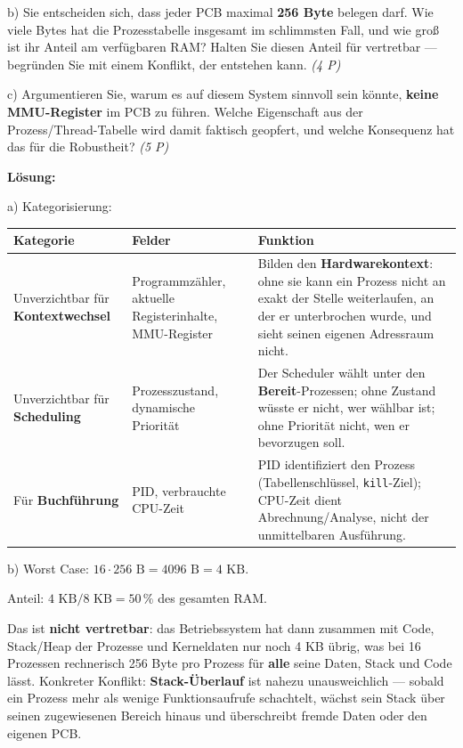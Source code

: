 \documentclass[11pt, a4paper]{article}
\begin{document}
b) Sie entscheiden sich, dass jeder PCB maximal \textbf{256 Byte} belegen darf. Wie viele Bytes hat die Prozesstabelle insgesamt im schlimmsten Fall, und wie groß ist ihr Anteil am verfügbaren RAM? Halten Sie diesen Anteil für vertretbar — begründen Sie mit einem Konflikt, der entstehen kann. \textit{(4 P)}


c) Argumentieren Sie, warum es auf diesem System sinnvoll sein könnte, \textbf{keine MMU-Register} im PCB zu führen. Welche Eigenschaft aus der Prozess/Thread-Tabelle wird damit faktisch geopfert, und welche Konsequenz hat das für die Robustheit? \textit{(5 P)}


\textbf{Lösung:}


a) Kategorisierung:



{\small
\begin{tabularx}{\linewidth}{XXX}
\hline
\rowcolor{tableheadbg}
{\color{white}\textbf{Kategorie}} & {\color{white}\textbf{Felder}} & {\color{white}\textbf{Funktion}} \\[2pt]
\hline
\endhead
\hline
\endfoot
Unverzichtbar für \textbf{Kontextwechsel} & Programmzähler, aktuelle Registerinhalte, MMU-Register & Bilden den \textbf{Hardwarekontext}: ohne sie kann ein Prozess nicht an exakt der Stelle weiterlaufen, an der er unterbrochen wurde, und sieht seinen eigenen Adressraum nicht. \\
Unverzichtbar für \textbf{Scheduling} & Prozesszustand, dynamische Priorität & Der Scheduler wählt unter den \textbf{Bereit}-Prozessen; ohne Zustand wüsste er nicht, wer wählbar ist; ohne Priorität nicht, wen er bevorzugen soll. \\
Für \textbf{Buchführung} & PID, verbrauchte CPU-Zeit & PID identifiziert den Prozess (Tabellenschlüssel, \texttt{kill}-Ziel); CPU-Zeit dient Abrechnung/Analyse, nicht der unmittelbaren Ausführung. \\
\end{tabularx}
}


b) Worst Case: $16 \cdot 256 \text{ B} = 4096 \text{ B} = 4 \text{ KB}$.

Anteil: $4 \text{ KB} / 8 \text{ KB} = 50\,\%$ des gesamten RAM.


Das ist \textbf{nicht vertretbar}: das Betriebssystem hat dann zusammen mit Code, Stack/Heap der Prozesse und Kerneldaten nur noch 4 KB übrig, was bei 16 Prozessen rechnerisch 256 Byte pro Prozess für \textbf{alle} seine Daten, Stack und Code lässt. Konkreter Konflikt: \textbf{Stack-Überlauf} ist nahezu unausweichlich — sobald ein Prozess mehr als wenige Funktionsaufrufe schachtelt, wächst sein Stack über seinen zugewiesenen Bereich hinaus und überschreibt fremde Daten oder den eigenen PCB.
\end{document}
